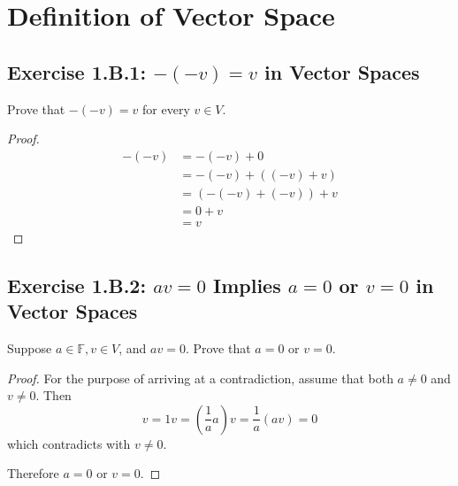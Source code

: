 \chapter{Definition of Vector Space}
\section{Exercise 1.B.1: $-(-v)=v$ in Vector Spaces}
Prove that $-(-v)=v$ for every $v\in V$.
\begin{proof}
\begin{equation*}
\begin{split}
-(-v)&=-(-v)+0\\
&=-(-v)+((-v)+v)\\
&=(-(-v)+(-v))+v\\
&=0+v\\
&=v
\end{split}
\end{equation*}
\end{proof}

\section{Exercise 1.B.2: $av=0$ Implies $a=0$ or $v=0$ in Vector Spaces}
Suppose $a\in\mathbb{F}, v\in V$, and $av=0$. Prove that $a=0$ or $v=0$.
\begin{proof}
For the purpose of arriving at a contradiction, assume that both $a\ne 0$ and $v\ne 0$. Then
\[
v=1v=(\frac{1}{a}a)v=\frac{1}{a}(av)=0
\]
which contradicts with $v\ne 0$.

Therefore $a=0$ or $v=0$.
\end{proof}


